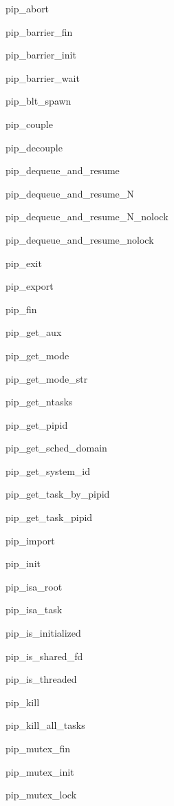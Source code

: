 \begin{DoxyItemize}
\item pip\-\_\-abort
\item pip\-\_\-barrier\-\_\-fin
\item pip\-\_\-barrier\-\_\-init
\item pip\-\_\-barrier\-\_\-wait
\item pip\-\_\-blt\-\_\-spawn
\item pip\-\_\-couple
\item pip\-\_\-decouple
\item pip\-\_\-dequeue\-\_\-and\-\_\-resume
\item pip\-\_\-dequeue\-\_\-and\-\_\-resume\-\_\-\-N
\item pip\-\_\-dequeue\-\_\-and\-\_\-resume\-\_\-\-N\-\_\-nolock
\item pip\-\_\-dequeue\-\_\-and\-\_\-resume\-\_\-nolock
\item pip\-\_\-exit
\item pip\-\_\-export
\item pip\-\_\-fin
\item pip\-\_\-get\-\_\-aux
\item pip\-\_\-get\-\_\-mode
\item pip\-\_\-get\-\_\-mode\-\_\-str
\item pip\-\_\-get\-\_\-ntasks
\item pip\-\_\-get\-\_\-pipid
\item pip\-\_\-get\-\_\-sched\-\_\-domain
\item pip\-\_\-get\-\_\-system\-\_\-id
\item pip\-\_\-get\-\_\-task\-\_\-by\-\_\-pipid
\item pip\-\_\-get\-\_\-task\-\_\-pipid
\item pip\-\_\-import
\item pip\-\_\-init
\item pip\-\_\-isa\-\_\-root
\item pip\-\_\-isa\-\_\-task
\item pip\-\_\-is\-\_\-initialized
\item pip\-\_\-is\-\_\-shared\-\_\-fd
\item pip\-\_\-is\-\_\-threaded
\item pip\-\_\-kill
\item pip\-\_\-kill\-\_\-all\-\_\-tasks
\item pip\-\_\-mutex\-\_\-fin
\item pip\-\_\-mutex\-\_\-init
\item pip\-\_\-mutex\-\_\-lock

\end{DoxyItemize}
